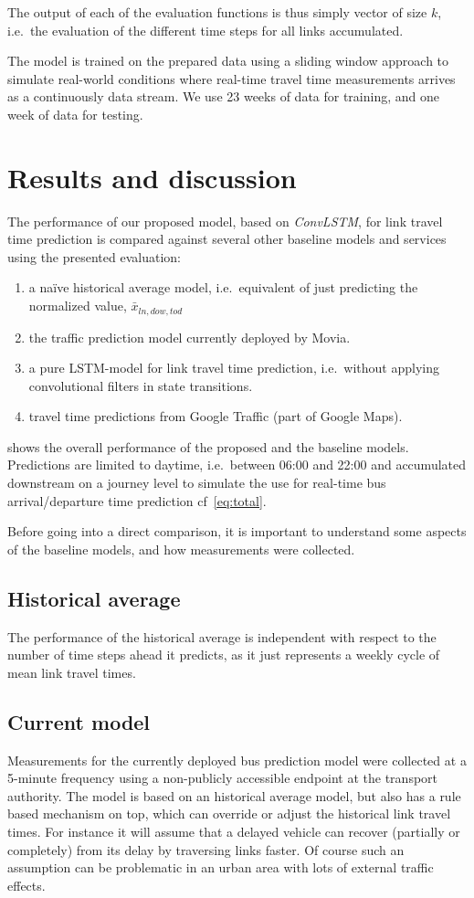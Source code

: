\documentclass[preprint,11pt,5p,twocolumn]{elsarticle}
\begin{document}
The output of each of the evaluation functions is thus simply vector of size $k$, i.e.\ the evaluation of the different time steps for all links accumulated.

The model is trained on the prepared data using a sliding window approach to simulate real-world conditions where real-time travel time measurements arrives as a continuously data stream. We use 23 weeks of data for training, and one week of data for testing.

\section{Results and discussion}
\label{sec:results}
The performance of our proposed model, based on \emph{ConvLSTM}, for link travel time prediction is compared against several other baseline models and services using the presented evaluation:
\begin{enumerate}
   \item a naïve historical average model, i.e.\ equivalent of just predicting the normalized value, $\bar{x}_{\mathit{ln},\mathit{dow},\mathit{tod}}$ 
   \item the traffic prediction model currently deployed by Movia.
   \item a pure LSTM-model for link travel time prediction, i.e.\ without applying convolutional filters in state transitions.
   \item travel time predictions from Google Traffic (part of Google Maps).
\end{enumerate}

 shows the overall performance of the proposed and the baseline models. Predictions are limited to daytime, i.e.\ between 06:00 and 22:00 and accumulated downstream on a journey level to simulate the use for real-time bus arrival/departure time prediction cf~\cref{eq:total}. 

Before going into a direct comparison, it is important to understand some aspects of the baseline models, and how measurements were collected.

\subsection{Historical average}
The performance of the historical average is independent with respect to the number of time steps ahead it predicts, as it just represents a weekly cycle of mean link travel times.

\subsection{Current model}
Measurements for the currently deployed bus prediction model were collected at a 5-minute frequency using a non-publicly accessible endpoint at the transport authority. The model is based on an historical average model, but also has a rule based mechanism on top, which can override or adjust the historical link travel times. For instance it will assume that a delayed vehicle can recover (partially or completely) from its delay by traversing links faster. Of course such an assumption can be problematic in an urban area with lots of external traffic effects. 
\end{document}
